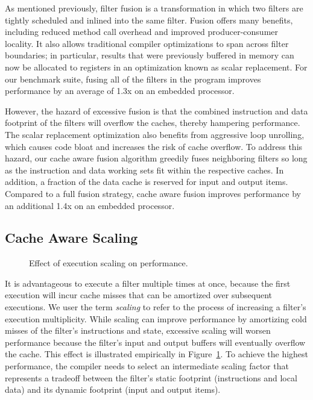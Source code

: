 As mentioned previously, filter fusion is a transformation in which
two filters are tightly scheduled and inlined into the same filter.
Fusion offers many benefits, including reduced method call overhead
and improved producer-consumer locality.  It also allows traditional
compiler optimizations to span across filter boundaries; in
particular, results that were previously buffered in memory can now be
allocated to registers in an optimization known as scalar replacement.
For our benchmark suite, fusing all of the filters in the program
improves performance by an average of 1.3x on an embedded processor.

However, the hazard of excessive fusion is that the combined
instruction and data footprint of the filters will overflow the
caches, thereby hampering performance.  The scalar replacement
optimization also benefits from aggressive loop unrolling, which
causes code bloat and increases the risk of cache overflow.  To
address this hazard, our cache aware fusion algorithm greedily fuses
neighboring filters so long as the instruction and data working sets
fit within the respective caches.  In addition, a fraction of the data
cache is reserved for input and output items.  Compared to a full
fusion strategy, cache aware fusion improves performance by an
additional 1.4x on an embedded processor.

\subsection*{Cache Aware Scaling}

\begin{figure}[t]
\caption{Effect of execution scaling on performance.\protect\label{fig:scaling}}
\end{figure}

It is advantageous to execute a filter multiple times at once, because
the first execution will incur cache misses that can be amortized over
subsequent executions.  We user the term {\it scaling} to refer to the
process of increasing a filter's execution multiplicity.  While
scaling can improve performance by amortizing cold misses of the
filter's instructions and state, excessive scaling will worsen
performance because the filter's input and output buffers will
eventually overflow the cache.  This effect is illustrated empirically
in Figure~\ref{fig:scaling}.  To achieve the highest performance, the
compiler needs to select an intermediate scaling factor that
represents a tradeoff between the filter's static footprint
(instructions and local data) and its dynamic footprint (input and
output items).

